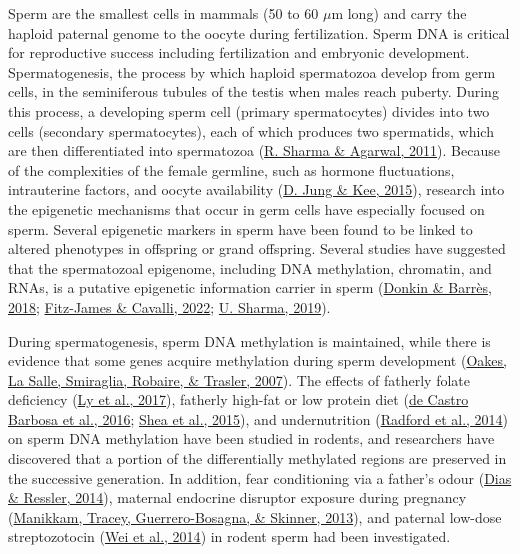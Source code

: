 \documentclass[12pt,twoside]{reedthesis}
\begin{document}
Sperm are the smallest cells in mammals (50 to 60 \(\mu\)m long) and carry
the haploid paternal genome to the oocyte during fertilization. Sperm
DNA is critical for reproductive success including fertilization and
embryonic development. Spermatogenesis, the process by which haploid
spermatozoa develop from germ cells, in the seminiferous tubules of the
testis when males reach puberty. During this process, a developing sperm
cell (primary spermatocytes) divides into two cells (secondary
spermatocytes), each of which produces two spermatids, which are then
differentiated into spermatozoa (\protect\hyperlink{ref-sharma2011}{R. Sharma \& Agarwal, 2011}). Because of the
complexities of the female germline, such as hormone fluctuations,
intrauterine factors, and oocyte availability (\protect\hyperlink{ref-jung2015}{D. Jung \& Kee, 2015}), research into
the epigenetic mechanisms that occur in germ cells have especially
focused on sperm. Several epigenetic markers in sperm have been found to
be linked to altered phenotypes in offspring or grand offspring. Several
studies have suggested that the spermatozoal epigenome, including DNA
methylation, chromatin, and RNAs, is a putative epigenetic information
carrier in sperm (\protect\hyperlink{ref-donkin2018}{Donkin \& Barrès, 2018}; \protect\hyperlink{ref-fitz-james2022}{Fitz-James \& Cavalli, 2022}; \protect\hyperlink{ref-sharma2019}{U. Sharma, 2019}).

During spermatogenesis, sperm DNA methylation is maintained, while there
is evidence that some genes acquire methylation during sperm development
(\protect\hyperlink{ref-oakes2007}{Oakes, La Salle, Smiraglia, Robaire, \& Trasler, 2007}). The effects of fatherly folate deficiency (\protect\hyperlink{ref-ly2017}{Ly et al., 2017}),
fatherly high-fat or low protein diet (\protect\hyperlink{ref-decastrobarbosa2016}{de Castro Barbosa et al., 2016}; \protect\hyperlink{ref-shea2015}{Shea et al., 2015}),
and undernutrition (\protect\hyperlink{ref-radford2014}{Radford et al., 2014}) on sperm DNA methylation have been
studied in rodents, and researchers have discovered that a portion of
the differentially methylated regions are preserved in the successive
generation. In addition, fear conditioning via a father's odour
(\protect\hyperlink{ref-dias2014}{Dias \& Ressler, 2014}), maternal endocrine disruptor exposure during pregnancy
(\protect\hyperlink{ref-manikkam2013}{Manikkam, Tracey, Guerrero-Bosagna, \& Skinner, 2013}), and paternal low-dose streptozotocin (\protect\hyperlink{ref-wei2014}{Wei et al., 2014}) in
rodent sperm had been investigated.\\
\end{document}
